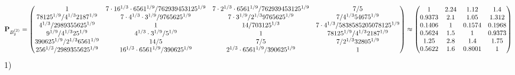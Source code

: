 \documentclass[10pt,a4paper]{article}
\begin{document}
	\[
		\bold{P}_{B_2^{(2)}} = 
		\begin{pmatrix}
			{1}{} & {{7} \cdot {16^ {1 / 3}} \cdot {6561^ {1 / 9}}} / {{762939453125^ {1 / 9}}} & {{7} \cdot {2^ {1 / 3}} \cdot {6561^ {1 / 9}}} / {{762939453125^ {1 / 9}}} & {{7}} / {{5}} \\
			{{78125^ {1 / 9}}} / {{4^ {1 / 3}}{2187^ {1 / 9}}} & {{7} \cdot {4^ {1 / 3}} \cdot {3^ {1 / 9}}} / {{9765625^ {1 / 9}}} & {{7} \cdot {3^ {1 / 9}}} / {{2^ {1 / 3}}{9765625^ {1 / 9}}} & {{7}} / {{4^ {1 / 3}}{54675^ {1 / 9}}} \\
			{{4^ {1 / 3}}} / {{2989355625^ {1 / 9}}} & {1}{} & {{14}} / {{703125^ {1 / 3}}} & {{7} \cdot {4^ {1 / 3}}} / {{5838585205078125^ {1 / 9}}} \\
			{{9^ {1 / 9}}} / {{4^ {1 / 3}}{25^ {1 / 9}}} & {{4^ {1 / 3}} \cdot {3^ {1 / 9}}} / {{5^ {1 / 9}}} & {1}{} & {{78125^ {1 / 9}}} / {{4^ {1 / 3}}{2187^ {1 / 9}}} \\
			{{390625^ {1 / 9}}} / {{2^ {1 / 3}}{6561^ {1 / 9}}} & {{14}} / {{5}} & {{7}} / {{5}} & {{7}} / {{2^ {1 / 3}}{32805^ {1 / 9}}} \\
			{{256^ {1 / 3}}} / {{2989355625^ {1 / 9}}} & {{16^ {1 / 3}} \cdot {6561^ {1 / 9}}} / {{390625^ {1 / 9}}} & {{2^ {1 / 3}} \cdot {6561^ {1 / 9}}} / {{390625^ {1 / 9}}} & {1}{} \\
		\end{pmatrix}
		\approx
		\begin{pmatrix}
			1        & 2.24     & 1.12     & 1.4      \\
			0.9373   & 2.1      & 1.05     & 1.312    \\
			0.1406   & 1        & 0.1574   & 0.1968   \\
			0.5624   & 1.5      & 1        & 0.9373   \\
			1.25     & 2.8      & 1.4      & 1.75     \\
			0.5622   & 1.6      & 0.8001   & 1        \\
		\end{pmatrix}
	\]
	1)
\end{document}
